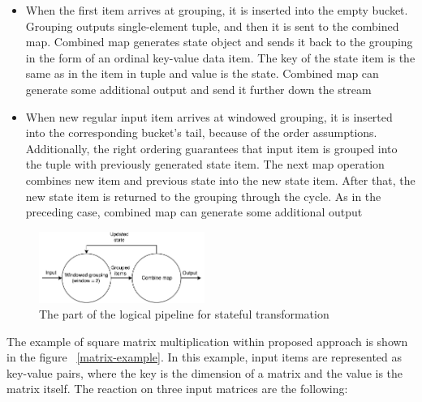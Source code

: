 \begin{itemize}
    \item When the first item arrives at grouping, it is inserted into the empty bucket. Grouping outputs single-element tuple, and then it is sent to the combined map. Combined map generates state object and sends it back to the grouping in the form of an ordinal key-value data item. The key of the state item is the same as in the item in tuple and value is the state. Combined map can generate some additional output and send it further down the stream
    \item When new regular input item arrives at windowed grouping, it is inserted into the corresponding bucket's tail, because of the order assumptions. Additionally, the right ordering guarantees that input item is grouped into the tuple with previously generated state item. The next map operation combines new item and previous state into the new state item. After that, the new state item is returned to the grouping through the cycle. As in the preceding case, combined map can generate some additional output
\end{itemize}

\begin{figure}[htbp]
  \centering
  \includegraphics[width=0.48\textwidth]{pics/stateful-schema}
  \caption{The part of the logical pipeline for stateful transformation}
  \label {stateful-schema}
\end{figure}

The example of square matrix multiplication within proposed approach is shown in the figure ~\ref{matrix-example}. In this example, input items are represented as key-value pairs, where the key is the dimension of a matrix and the value is the matrix itself. The reaction on three input matrices are the following:

